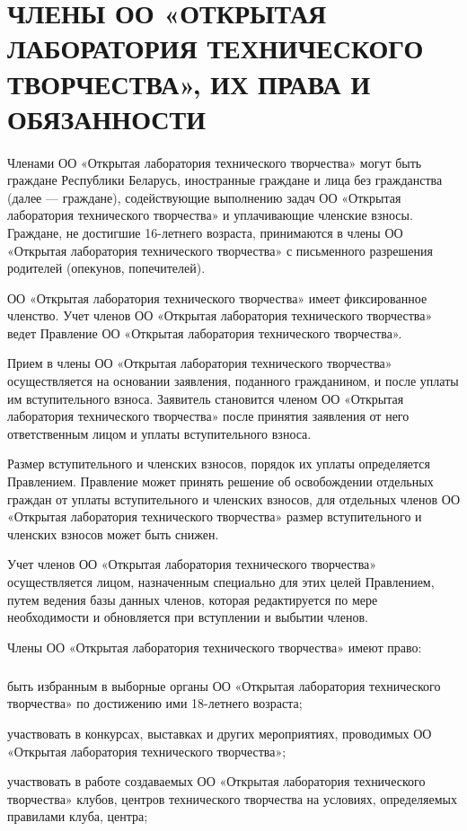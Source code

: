 \documentclass[a4paper,fontsize=14pt,titlepage]{scrartcl}
\makeatletter
\newenvironment{numberedpars}{%
  \addtocounter{secnumdepth}{1}
  \renewcommand\theparagraph{\arabic{section}.\arabic{paragraph}}
  \renewcommand\@seccntformat[1]
  {\expandafter\ifx\csname##1\endcsname\paragraph\csname 
  the##1\endcsname\else\csname the##1\endcsname\quad\fi}
  \let\old@par=\par
  \def\new@par{\let\par=\old@par\paragraph{}\let\par=\new@par}
  \let\par=\new@par
  \par
}{
  \addtocounter{secnumdepth}{-1}
}
\newenvironment{numberedsubpars}{%
  \addtocounter{secnumdepth}{1}
  \renewcommand\thesubparagraph{\arabic{section}.\arabic{paragraph}.\arabic{subparagraph}}
  \renewcommand\@seccntformat[1]
  {\expandafter\ifx\csname##1\endcsname\subparagraph\csname 
  the##1\endcsname\else\csname the##1\endcsname\quad\fi}
  \let\old@@par=\par
  \def\new@@par{\let\par=\old@par\subparagraph{}\let\par=\new@@par}
  \let\par=\new@@par
  \par
}{
  \addtocounter{secnumdepth}{-1}
  \let\par=\old@@par
}
\let\@@@section=\section
\renewcommand\section[1]{\@@@section{\MakeUppercase{#1}}}
\makeatother
\begin{document}
\section{Члены ОО «Открытая лаборатория технического творчества», их права и обязанности}

\begin{numberedpars}
Членами ОО «Открытая лаборатория технического творчества» могут быть граждане Республики Беларусь, иностранные граждане
и лица без гражданства (далее — граждане), содействующие выполнению задач ОО «Открытая лаборатория технического
творчества» и уплачивающие членские взносы. Граждане, не достигшие 16-летнего возраста, принимаются в члены ОО «Открытая
лаборатория технического творчества» с письменного разрешения родителей (опекунов, попечителей).

ОО «Открытая лаборатория технического творчества» имеет фиксированное членство. Учет членов ОО «Открытая лаборатория
технического творчества» ведет Правление ОО «Открытая лаборатория технического творчества».

Прием в члены ОО «Открытая лаборатория технического творчества» осуществляется на основании заявления, поданного
гражданином, и после уплаты им вступительного взноса. Заявитель становится членом ОО «Открытая лаборатория технического
творчества» после принятия заявления от него ответственным лицом и уплаты вступительного взноса.

Размер вступительного и членских взносов, порядок их уплаты определяется Правлением. Правление может принять решение об
освобождении отдельных граждан от уплаты вступительного и членских взносов, для отдельных членов ОО «Открытая
лаборатория технического творчества» размер вступительного и членских взносов может быть снижен.

Учет членов ОО «Открытая лаборатория технического творчества» осуществляется лицом, назначенным специально для этих
целей Правлением, путем ведения базы данных членов, которая редактируется по мере необходимости и обновляется при
вступлении и выбытии членов.

Члены ОО «Открытая лаборатория технического творчества» имеют право:
\begin{numberedsubpars}
быть избранным в выборные органы ОО «Открытая лаборатория технического творчества» по достижению ими 18-летнего
возраста;

участвовать в конкурсах, выставках и других мероприятиях, проводимых ОО «Открытая лаборатория технического творчества»;

участвовать в работе создаваемых ОО «Открытая лаборатория технического творчества» клубов, центров технического
творчества на условиях, определяемых правилами клуба, центра;


\end{numberedsubpars}
\end{numberedpars}
\end{document}
